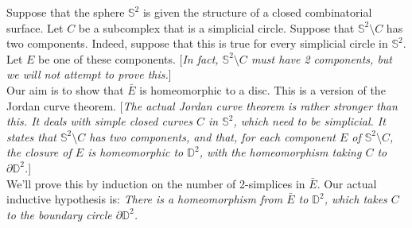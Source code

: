 \documentclass[answers]{exam}
\begin{document}
\begin{questions}
\question%
Suppose that the sphere $\mathbb{S}^{2}$ is given the structure of a closed combinatorial surface. Let $C$ be a subcomplex that is a simplicial circle. Suppose that $\mathbb{S}^{2} \setminus C$ has two components. Indeed, suppose that this is true for every simplicial circle in $\mathbb{S}^{2}$. Let $E$ be one of these components. [\emph{In fact, $\mathbb{S}^{2} \setminus C$ \emph{must} have 2 components, but we will not attempt to prove this.}]\\ Our aim is to show that $\bar{E}$ is homeomorphic to a disc. This is a version of the Jordan curve theorem. [\emph{The actual Jordan curve theorem is rather stronger than this. It deals with simple closed curves $C$ in $\mathbb{S}^{2}$, which need to be simplicial. It states that $\mathbb{S}^{2} \setminus C$ has two components, and that, for each component $E$ of $\mathbb{S}^{2} \setminus C$, the closure of $E$ is homeomorphic to $\mathbb{D}^{2}$, with the homeomorphism taking $C$ to $\partial \mathbb{D}^{2}$.}]\\ We'll prove this by induction on the number of 2-simplices in $\bar{E}$. Our actual inductive hypothesis is: \emph{There is a homeomorphism from $\bar{E}$ to $\mathbb{D}^{2}$, which takes $C$ to the boundary circle $\partial \mathbb{D}^{2}$.}
\end{questions}
\end{document}

